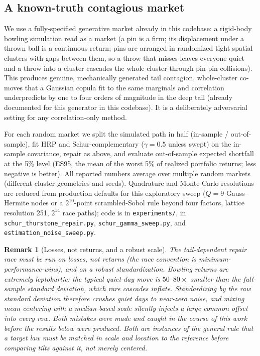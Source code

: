 \documentclass[11pt]{article}
\newtheorem{remark}{Remark}
\begin{document}
\subsection{A known-truth contagious market}
\label{sec:market}

We use a fully-specified generative market already in this codebase: a
rigid-body bowling simulation read as a market (a pin is a firm; its
displacement under a thrown ball is a continuous return; pins are arranged in
randomized tight spatial clusters with gaps between them, so a throw that
misses leaves everyone quiet and a throw into a cluster cascades the whole
cluster through pin-pin collisions). This produces genuine, mechanically
generated tail contagion, whole-cluster co-moves that a Gaussian copula fit
to the same marginals and correlation underpredicts by one to four orders of
magnitude in the deep tail (already documented for this generator in this
codebase). It is a deliberately adversarial setting for any correlation-only
method.

For each random market we split the simulated path in half (in-sample /
out-of-sample), fit HRP and Schur-complementary ($\gamma=0.5$ unless swept)
on the in-sample covariance, repair as above, and evaluate out-of-sample
expected shortfall at the 5\% level (ES95, the mean of the worst 5\% of
realized portfolio returns; less negative is better). All reported numbers
average over multiple random markets (different cluster geometries and
seeds). Quadrature and Monte-Carlo resolutions are reduced from production
defaults for this exploratory sweep ($Q=9$ Gauss--Hermite nodes or a
$2^{10}$-point scrambled-Sobol rule beyond four factors, lattice
resolution 251, $2^{14}$ race paths); code is in \texttt{experiments/}, in
\texttt{schur\_thurstone\_repair.py}, \texttt{schur\_gamma\_sweep.py}, and
\texttt{estimation\_noise\_sweep.py}.

\begin{remark}[Losses, not returns, and a robust scale]
The tail-dependent repair race must be run on \emph{losses}, not returns
(the race convention is minimum-performance-wins), and on a \emph{robust}
standardization. Bowling returns are extremely leptokurtic: the typical
quiet-day move is $50$--$80\times$ smaller than the full-sample standard
deviation, which rare cascades inflate. Standardizing by the raw standard
deviation therefore crushes quiet days to near-zero noise, and mixing mean
centering with a median-based scale silently injects a large common offset
into every row. Both mistakes were made and caught in the course of this
work before the results below were produced. Both are instances of the
general rule that a target law must be matched in scale and location to the
reference before comparing tilts against it, not merely centered.
\end{remark}
\end{document}
